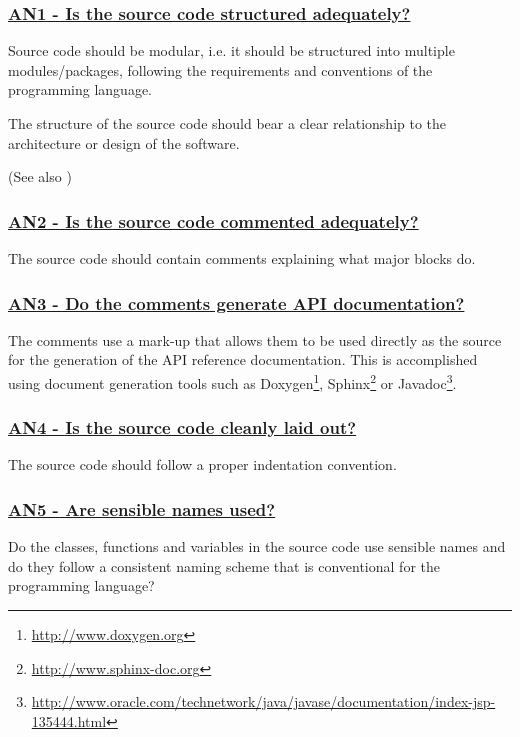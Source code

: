 \documentclass[a4paper,11pt]{article}
\newcommand{\criterion}[2]{\subsubsection*{\underline{#1 - #2}}\label{id:#1}}
\newcommand\CheckTable{%
  \begin{tabular}{ccccc}
    No & Minimal & Adequate & Good & Perfect \\
    0 & 1 & 2 & 3 & 4 \\
    \hline
    $\square$ & $\square$ & $\square$ & $\square$ & $\square$ \\
  \end{tabular}%
}
\newcommand{\refcrit}[1]{%
 \framebox[1.1\width]{\hyperref[id:#1]{#1}}
}
\begin{document}
\newcommand{\anOneID}{AN1}
\newcommand{\anOneText}{Is the source code structured adequately?}
\criterion{\anOneID}{\anOneText}

Source code should be modular, i.e. it should be structured into multiple
modules/packages, following the requirements and conventions of the programming
language. 

The structure of the source code should bear a clear relationship to the
architecture or design of the software.

(See also \refcrit{R3})


\newcommand{\anTwoID}{AN2}
\newcommand{\anTwoText}{Is the source code commented adequately?}
\criterion{\anTwoID}{\anTwoText}

The source code should contain comments explaining what major blocks do.


\newcommand{\anThreeID}{AN3}
\newcommand{\anThreeText}{Do the comments generate API documentation?}
\criterion{\anThreeID}{\anThreeText}

The comments use a mark-up that allows them to be used directly as the
source for the generation of the API reference documentation. This is
%
%
%
accomplished using document generation tools such as Doxygen\footnote{\url{http://www.doxygen.org}}, Sphinx\footnote{\url{http://www.sphinx-doc.org}} or
Javadoc\footnote{\url{http://www.oracle.com/technetwork/java/javase/documentation/index-jsp-135444.html}}.


\newcommand{\anFourID}{AN4}
\newcommand{\anFourText}{Is the source code cleanly laid out?}
\criterion{\anFourID}{\anFourText}

The source code should follow a proper indentation convention. 


\newcommand{\anFiveID}{AN5}
\newcommand{\anFiveText}{Are sensible names used?}
\criterion{\anFiveID}{\anFiveText}

Do the classes, functions and variables in the source code use sensible names
and do they follow a consistent naming scheme that is conventional for the
programming language?

\end{document}
